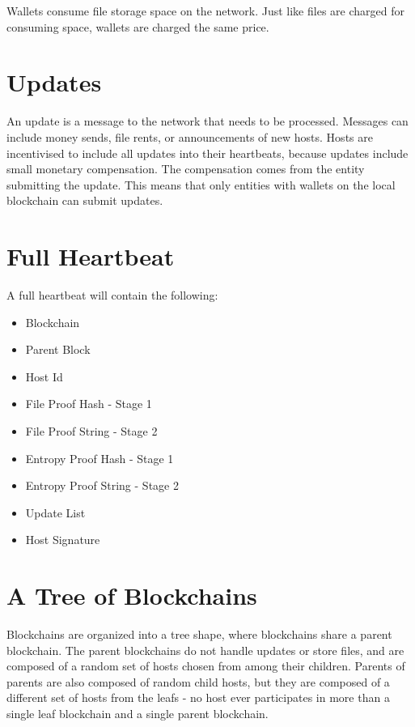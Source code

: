 \documentclass[twocolumn]{article}
\begin{document}
Wallets consume file storage space on the network.
Just like files are charged for consuming space, wallets are charged the same price.

\section{Updates}

An update is a message to the network that needs to be processed.
Messages can include money sends, file rents, or announcements of new hosts.
Hosts are incentivised to include all updates into their heartbeats, because updates include small monetary compensation.
The compensation comes from the entity submitting the update.
This means that only entities with wallets on the local blockchain can submit updates.


\section{Full Heartbeat}

A full heartbeat will contain the following:

\begin{itemize}
	\item Blockchain
	\item Parent Block
	\item Host Id
	\item File Proof Hash - Stage 1
	\item File Proof String - Stage 2
	\item Entropy Proof Hash - Stage 1
	\item Entropy Proof String - Stage 2
	\item Update List
	\item Host Signature
\end{itemize}

\section{A Tree of Blockchains}

Blockchains are organized into a tree shape, where \childrenperparent{} blockchains share a parent blockchain.
The parent blockchains do not handle updates or store files, and are composed of a random set of hosts chosen from among their children.
Parents of parents are also composed of random child hosts, but they are composed of a different set of hosts from the leafs - no host ever participates in more than a single leaf blockchain and a single parent blockchain.
\end{document}
